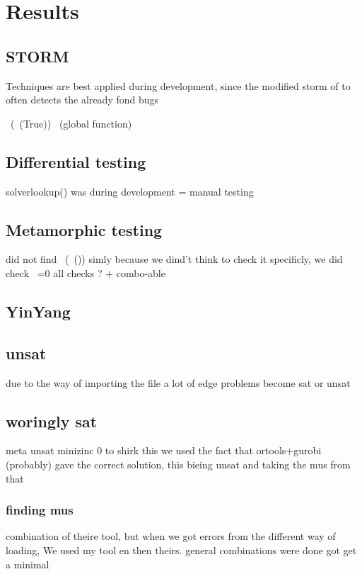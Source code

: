 \chapter{Results}
\label{cha:6}


\section{STORM}
Techniques are best applied during development, since the modified storm of to often detects the already fond bugs


~(~(True))
~(global function)
\section{Differential testing}
solverlookup()  was during development = manual testing

\section{Metamorphic testing}
did not find ~(~()) simly because we dind't think to check it specificly, we did check ~=0
all checks ? + combo-able

\section{YinYang}


\section{unsat}
due to the way of importing the file a lot of edge problems become sat or unsat

\section{woringly sat}
meta unsat minizinc 0
to shirk this we used the fact that ortools+gurobi (probably) gave the correct solution, this bieing unsat and taking the mus from that


\subsection{finding mus}
combination of theire tool, but when we got errors from the different way of loading, We used my tool en then theirs. general combinations were done got get a minimal


